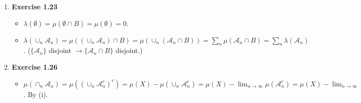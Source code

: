 \documentclass[10pt, letterpaper,bibtotoc, tablecaptionabove, figurecaptionabove]{article}
\begin{document}
\begin{enumerate}
\begin{itemize}
\end{itemize}
\item{\bf{Exercise 1.23}}
\begin{itemize}
\item $\lambda(\emptyset)=\mu(\emptyset\cap B)=\mu(\emptyset)=0$.
\item $\lambda(\cup_n \mathcal A_n)=\mu((\cup_n\mathcal A_n)\cap B)=\mu(\cup_n(\mathcal A_n\cap B))=\sum_n\mu(\mathcal A_n\cap B)=\sum_n\lambda(\mathcal A_n)$. ($\{\mathcal A_n\}$ disjoint $\rightarrow \{\mathcal A_n\cap B\}$ disjoint.)
\end{itemize}
\item {\bf{Exercise 1.26}}
\begin{itemize}
\item $\mu(\cap_n\mathcal A_n)=\mu((\cup_n \mathcal A_n^c)^c)=\mu(X)-\mu(\cup_n \mathcal A_n^c)=\mu(X)-\lim_{n\rightarrow\infty}\mu(\mathcal A_n^c)=\mu(X)-\lim_{n\rightarrow\infty}(\mu(X)-\mu(\mathcal A_n))=\lim_{n\rightarrow\infty}\mu(\mathcal A_n)$. By (i).
\end{itemize}

\end{enumerate}
\end{document}
